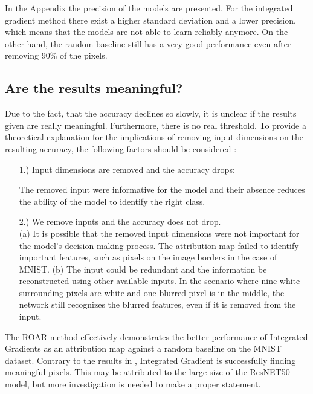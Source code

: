 \documentclass[conference]{IEEEtran}
\begin{document}
In the Appendix the precision of the models are presented. For the integrated gradient method there exist a higher standard deviation and a lower precision, which means that the models are not able to learn reliably anymore. On the other hand, the random baseline still has a very good performance even after removing 90\% of the pixels.


\subsection{Are the results meaningful?}

Due to the fact, that the accuracy declines so slowly, it is unclear if the results given are really meaningful. Furthermore, there is no real threshold. To provide a theoretical explanation for the implications of removing input dimensions on the resulting accuracy, the following factors should be considered \cite{8_RoaR}:


\begin{enumerate}
	\item[1.)] Input dimensions are removed and the accuracy drops:
	
	The removed input were informative for the model and their absence reduces the ability of the model to identify the right class.
	
	\item[2.)] We remove inputs and the accuracy does not drop.
	\\
	(a)  It is possible that the removed input dimensions were not important for the model's decision-making process. The attribution map failed to identify important features, such as pixels on the image borders in the case of MNIST.
	(b) The input could be redundant and the information be reconstructed using other available inputs. In the scenario where nine white surrounding pixels are white and one blurred pixel is in the middle, the network still recognizes the blurred features, even if it is removed from the input.
\end{enumerate}

The ROAR method effectively demonstrates the better performance of Integrated Gradients as an attribution map against a random baseline on the MNIST dataset. Contrary to the results in \cite{8_RoaR}, Integrated Gradient is successfully finding meaningful pixels. This may be attributed to the large size of the ResNET50 model, but more investigation is needed to make a proper statement. 
\end{document}
